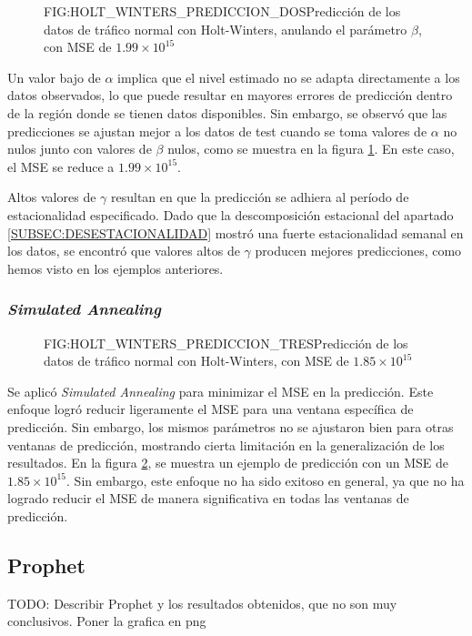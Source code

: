 \begin{figure}[Predicción de los datos de tráfico normal con Holt-Winters, anulando el parámetro $\beta$]{FIG:HOLT_WINTERS_PREDICCION_DOS}{Predicción de los datos de tráfico normal con Holt-Winters, anulando el parámetro $\beta$, con \ac{MSE} de $1.99\times 10^{15}$}
    \label{FIG:HOLT_WINTERS_PREDICCION_DOS}
\end{figure}

Un valor bajo de $\alpha$ implica que el nivel estimado no se adapta directamente a los datos observados, lo que puede resultar en mayores errores de predicción dentro de la región donde se tienen datos disponibles. Sin embargo, se observó que las predicciones se ajustan mejor a los datos de test cuando se toma valores de $\alpha$ no nulos junto con valores de $\beta$ nulos, como se muestra en la figura \ref{FIG:HOLT_WINTERS_PREDICCION_DOS}. En este caso, el \ac{MSE} se reduce a $1.99\times 10^{15}$.

Altos valores de $\gamma$ resultan en que la predicción se adhiera al período de estacionalidad especificado.
Dado que la descomposición estacional del apartado \ref{SUBSEC:DESESTACIONALIDAD} mostró una fuerte estacionalidad semanal en los datos, se encontró que valores altos de $\gamma$ producen mejores predicciones, como hemos visto en los ejemplos anteriores.

\subsubsection{\textit{Simulated Annealing}}

\begin{figure}[Predicción de los datos de tráfico normal con Holt-Winters, con MSE de $1.85\times 10^{15}$]{FIG:HOLT_WINTERS_PREDICCION_TRES}{Predicción de los datos de tráfico normal con Holt-Winters, con \ac{MSE} de $1.85\times 10^{15}$}
    \label{FIG:HOLT_WINTERS_PREDICCION_TRES}
\end{figure}

Se aplicó \textit{Simulated Annealing} para minimizar el MSE en la predicción. Este enfoque logró reducir ligeramente el MSE para una ventana específica de predicción. Sin embargo, los mismos parámetros no se ajustaron bien para otras ventanas de predicción, mostrando cierta limitación en la generalización de los resultados. En la figura \ref{FIG:HOLT_WINTERS_PREDICCION_TRES}, se muestra un ejemplo de predicción con un MSE de $1.85\times 10^{15}$. Sin embargo, este enfoque no ha sido exitoso en general, ya que no ha logrado reducir el MSE de manera significativa en todas las ventanas de predicción.

\subsection{Prophet}

TODO: Describir Prophet y los resultados obtenidos, que no son muy conclusivos. Poner la grafica en png